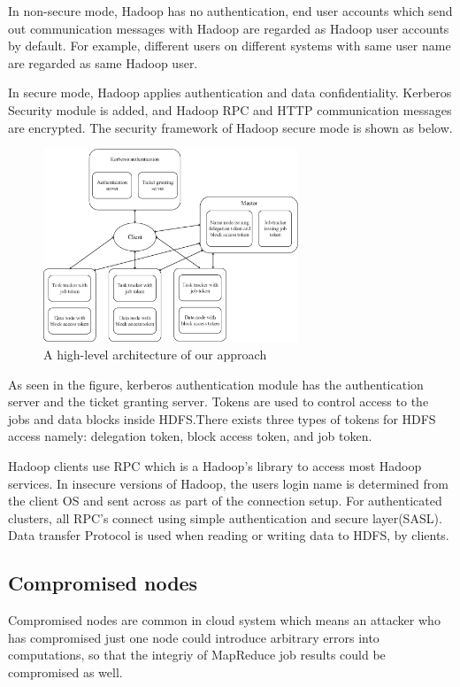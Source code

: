 In non-secure mode, Hadoop has no authentication, end user accounts which send out communication messages with Hadoop are regarded as Hadoop user accounts by default. For example, different users on different systems with same user name are regarded as same Hadoop user.

In secure mode, Hadoop applies authentication and data confidentiality. Kerberos Security module is added, and Hadoop RPC and HTTP communication messages are encrypted. The security framework of Hadoop secure mode is shown as below.

\begin{figure}[t]
  \centering
  \includegraphics[width=3in]{figs/security_hadoop.eps}
  \caption{A high-level architecture of our approach}
  \label{fig:overview}
\end{figure}

As seen in the figure, kerberos authentication module has the authentication server and the ticket granting server. Tokens are used to control access to the jobs and data blocks inside HDFS.There exists three types of tokens for HDFS access namely: delegation token, block access token, and job token.

Hadoop clients use RPC which is a Hadoop’s library to access most Hadoop services. In insecure versions of Hadoop, the users login name is determined from the client OS and sent across as part of the connection setup. For authenticated clusters, all RPC’s connect using simple authentication and secure layer(SASL). Data transfer Protocol is used when reading or writing data to HDFS, by clients.

\subsection{Compromised nodes}

Compromised nodes are common in cloud system which means an attacker who has compromised just one node could introduce arbitrary errors into computations, so that the integriy of MapReduce job results could be compromised as well.


